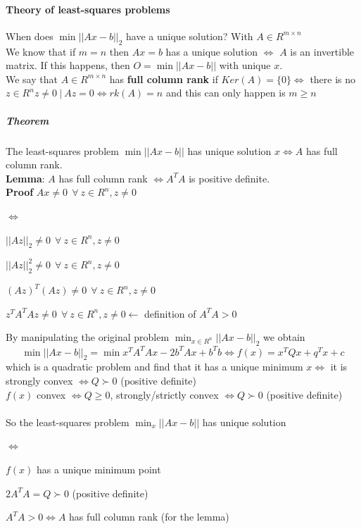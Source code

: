 \documentclass[10pt]{report}
\begin{document}
\paragraph{Theory of least-squares problems} When does $\min ||Ax-b||_2$ have a unique solution? With $A \in R^{m\times n}$\\
We know that if $m=n$ then $Ax = b$ has a unique solution $\Leftrightarrow$ $A$ is an invertible matrix. If this happens, then $O = \min||Ax-b||$ with unique $x$.\\
We say that $A\in R^{m\times n}$ has \textbf{full column rank} if $Ker(A) = \{0\} \Leftrightarrow$ there is no $z\in R^n z\neq 0\:|\:Az=0\Leftrightarrow rk(A) = n$ and this can only happen is $m\geq n$\\
\subparagraph{Theorem}The least-squares problem $\min ||Ax-b||$ has unique solution $x\Leftrightarrow A$ has full column rank.\\
\textbf{Lemma}: $A$ has full column rank $\Leftrightarrow A^TA$ is positive definite.\\
\textbf{Proof} $Ax \neq 0\:\:\forall\:z\in R^n, z\neq 0$
\begin{list}{$\Leftrightarrow$}{}
	\item $||Az||_2 \neq 0\:\:\forall\:z\in R^n, z\neq 0$
	\item $||Az||_2^2 \neq 0\:\:\forall\:z\in R^n, z\neq 0$
	\item $(Az)^T(Az)\neq 0\:\:\forall\:z\in R^n, z\neq 0$
	\item $z^TA^TAz\neq 0\:\:\forall\:z\in R^n, z\neq 0 \longleftarrow$ definition of $A^TA > 0$
\end{list}
By manipulating the original problem $\min_{x\in R^n} ||Ax-b||_2$ we obtain $$\min ||Ax-b||_2 = \min x^TA^TAx - 2b^TAx + b^Tb \Leftrightarrow f(x) = x^TQx + q^Tx + c$$ which is a quadratic problem and find that it has a unique minimum $x \Leftrightarrow$ it is strongly convex $\Leftrightarrow Q \succ 0$ (positive definite)\\
$f(x)$ convex $\Leftrightarrow Q \geq 0$, strongly/strictly convex $\Leftrightarrow Q \succ 0$ (positive definite)\\\\
So the least-squares problem $\min_x ||Ax-b||$ has unique solution
\begin{list}{$\Leftrightarrow$}{}
	\item $f(x)$ has a unique minimum point
	\item $2A^TA = Q \succ 0$ (positive definite)
	\item $A^TA > 0 \Leftrightarrow A$ has full column rank (for the lemma)
\end{list}
\end{document}

